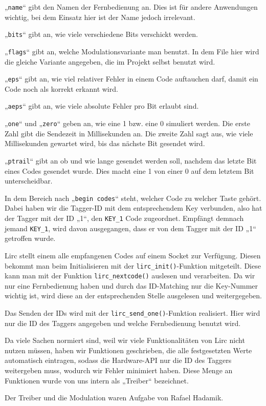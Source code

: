 „\texttt{name}“ gibt den Namen der Fernbedienung an. Dies ist für andere Anwendungen wichtig,
bei dem Einsatz hier ist der Name jedoch irrelevant.

„\texttt{bits}“ gibt an, wie viele verschiedene Bits verschickt werden.

„\texttt{flags}“ gibt an, welche Modulationsvariante man benutzt. In dem File hier wird die gleiche Variante angegeben,
die im Projekt selbst benutzt wird.

„\texttt{eps}“ gibt an, wie viel relativer Fehler in einem Code auftauchen darf, damit ein Code noch als korrekt erkannt wird.

„\texttt{aeps}“ gibt an, wie viele absolute Fehler pro Bit erlaubt sind.

„\texttt{one}“ und „\texttt{zero}“ geben an, wie eine 1 bzw. eine 0 simuliert werden.
Die erste Zahl gibt die Sendezeit in Millisekunden an. Die zweite Zahl sagt aus, wie viele Millisekunden gewartet wird,
bis das nächste Bit gesendet wird.

„\texttt{ptrail}“ gibt an ob und wie lange gesendet werden soll, nachdem das letzte Bit eines Codes gesendet wurde. 
Dies macht eine 1 von einer 0 auf dem letztem Bit unterscheidbar.

In dem Bereich nach „\texttt{begin codes}“ steht, welcher Code zu welcher Taste gehört. Dabei haben wir die Tagger-ID mit dem
entsprechendem Key verbunden, also hat der Tagger mit der ID „1“, den \texttt{KEY_1} Code zugeordnet. Empfängt demnach
jemand \texttt{KEY_1}, wird davon ausgegangen, dass er von dem Tagger mit der ID „1“ getroffen wurde.

Lirc stellt einem alle empfangenen Codes auf einem Socket zur Verfügung. Diesen bekommt man beim Initialisieren mit der
\texttt{lirc\_init()}-Funktion mitgeteilt.
Diese kann man mit der Funktion \texttt{lirc\_nextcode()} auslesen und verarbeiten. Da wir nur eine Fernbedienung haben
und durch das ID-Matching nur die Key-Nummer wichtig ist, wird diese an der entsprechenden Stelle ausgelesen und weitergegeben.

Das Senden der IDs wird mit der \texttt{lirc\_send\_one()}-Funktion realisiert. Hier wird nur die ID des Taggers angegeben
und welche Fernbedienung benutzt wird.

Da viele Sachen normiert sind, weil wir viele Funktionalitäten von Lirc nicht nutzen müssen, haben wir Funktionen geschrieben,
die alle festgesetzten Werte automatisch eintragen, sodass die Hardware-API nur die ID des Taggers weitergeben muss,
wodurch wir Fehler minimiert haben. Diese Menge an Funktionen wurde von uns intern als „Treiber“ bezeichnet.

Der Treiber und die Modulation waren Aufgabe von Rafael Hadamik. 

